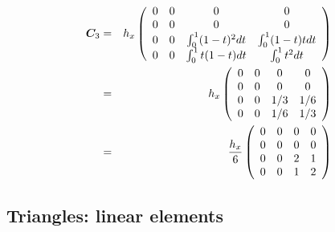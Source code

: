 \begin{eqnarray}
{\bm C}_3 
&=&
h_x
\left(
\begin{array}{cccc}
0 & 0 & 0 & 0 \\
0 & 0 & 0 & 0 \\ 
0 & 0 & \int_{0}^1 (1-t)^2 dt & \int_{0}^1 (1-t)t  dt \\
0 & 0 & \int_{0}^1 t(1-t) dt & \int_{0}^1 t^2 dt 
\end{array}
\right) \nonumber\\
&=& 
h_x
\left(
\begin{array}{cccc}
0 & 0 & 0 & 0 \\ 
0 & 0 & 0 & 0  \\
0 & 0 & 1/3 & 1/6 \\
0 & 0 & 1/6 & 1/3 
\end{array}
\right) \nonumber\\
&=& 
\frac{h_x}{6}
\left(
\begin{array}{cccc}
0 & 0 & 0 & 0 \\ 
0 & 0 & 0 & 0  \\
0 & 0 & 2 & 1 \\
0 & 0 & 1 & 2 
\end{array}
\right) 
\end{eqnarray}












\newpage




\subsection{Triangles: linear elements} \label{ss:tle}

